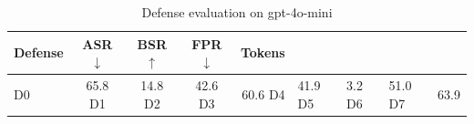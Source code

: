 \begin{table}[t]
\centering
\small
\begin{tabular}{l c c c r}
\toprule
Defense & ASR $\downarrow$ & BSR $\uparrow$ & FPR $\downarrow$ & Tokens \\
\midrule
D0 & 65.8%
D1 & 14.8%
D2 & 42.6%
D3 & 60.6%
D4 & 41.9%
D5 & 3.2%
D6 & 51.0%
D7 & 63.9%
\bottomrule
\end{tabular}
\caption{Defense evaluation on gpt-4o-mini}
\label{tab:results_gpt_4o_mini}
\end{table}